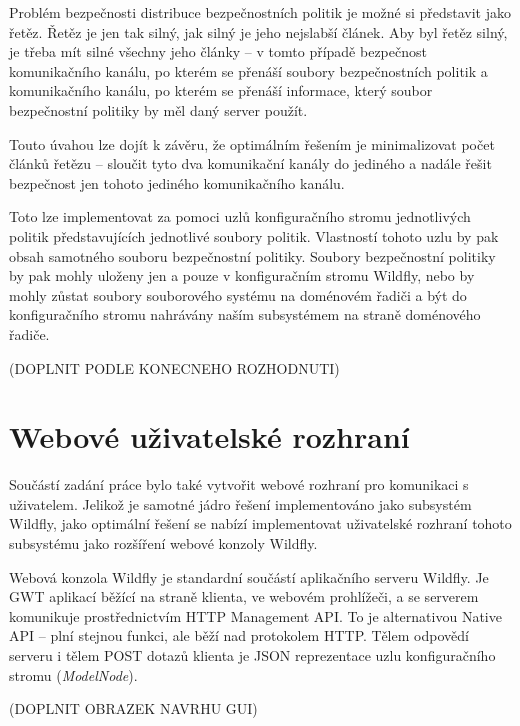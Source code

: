 Problém bezpečnosti distribuce bezpečnostních politik je možné si představit jako řetěz. Řetěz je jen tak silný, jak silný je jeho nejslabší článek. Aby byl řetěz silný, je třeba mít silné všechny jeho články -- v tomto případě bezpečnost komunikačního kanálu, po kterém se přenáší soubory bezpečnostních politik a komunikačního kanálu, po kterém se přenáší informace, který soubor bezpečnostní politiky by měl daný server použít.

Touto úvahou lze dojít k závěru, že optimálním řešením je minimalizovat počet článků řetězu -- sloučit tyto dva komunikační kanály do jediného a nadále řešit bezpečnost jen tohoto jediného komunikačního kanálu.

Toto lze implementovat za pomoci uzlů konfiguračního stromu jednotlivých politik představujících jednotlivé soubory politik. Vlastností tohoto uzlu by pak obsah samotného souboru bezpečnostní politiky. Soubory bezpečnostní politiky by pak mohly uloženy jen a pouze v konfiguračním stromu Wildfly, nebo by mohly zůstat soubory souborového systému na doménovém řadiči a být do konfiguračního stromu nahrávány naším subsystémem na straně doménového řadiče.

(DOPLNIT PODLE KONECNEHO ROZHODNUTI)

\section{Webové uživatelské rozhraní}

Součástí zadání práce bylo také vytvořit webové rozhraní pro komunikaci s uživatelem. Jelikož je samotné jádro řešení implementováno jako subsystém Wildfly, jako optimální řešení se nabízí implementovat uživatelské rozhraní tohoto subsystému jako rozšíření webové konzoly Wildfly.

Webová konzola Wildfly je standardní součástí aplikačního serveru Wildfly. Je GWT aplikací běžící na straně klienta, ve webovém prohlížeči, a se serverem komunikuje prostřednictvím HTTP Management API. To je alternativou Native API -- plní stejnou funkci, ale běží nad protokolem HTTP. Tělem odpovědí serveru i tělem POST dotazů klienta je JSON reprezentace uzlu konfiguračního stromu ({\it ModelNode}). \cite{wildflyManagementAPIreference}

(DOPLNIT OBRAZEK NAVRHU GUI)

